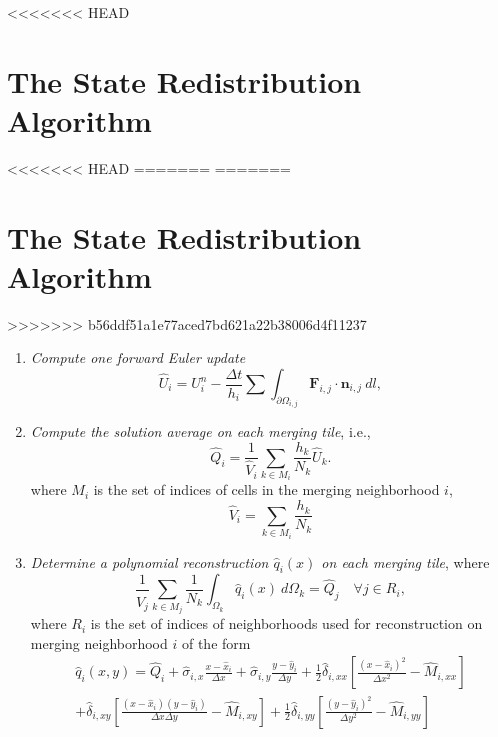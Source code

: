<<<<<<< HEAD
\section{The State Redistribution Algorithm}\label{srdAlg}
<<<<<<< HEAD
=======
=======
\section{The State Redistribution Algorithm}\label{sec:srdAlg}
>>>>>>> b56ddf51a1e77aced7bd621a22b38006d4f11237
\begin{enumerate}[label=Step \arabic*:]
    \item \textit{Compute one forward Euler update}
    \begin{equation} 
    \hat{U}_i = U^n_i - \frac{\Delta t}{h_i}\sum \int_{\partial \Omega_{i,j}} \mathbf{F}_{i,j} \cdot \mathbf{n}_{i,j}~dl,\label{eq:scheme}
    \end{equation}
	\item \textit{Compute the solution average on each merging tile}, i.e.,
	\begin{equation}\label{eq:q_avg1}
	    \hat Q_i =  \frac{1}{\hat V_i}\sum_{k \in M_i}\frac{h_k}{N_k} \hat U_k.
	\end{equation}
	where $M_i$ is the set of indices of cells in the merging neighborhood $i$, 
	\begin{equation}\label{eq:modV}
	\hat V_i = \sum_{k \in M_i}\frac{h_k}{N_k}
	\end{equation}
\item \textit{Determine a polynomial reconstruction $\hat q_i(x)$ on each merging tile}, where
\begin{equation}\label{eq:qi}
\frac{1}{\hat V_j}\sum_{k \in M_j}\frac{1}{N_k}\int_{\Omega_k} \hat q_i(x)~d\Omega_k = \hat Q_j \quad \forall j \in R_i,
\end{equation}
where $R_i$ is the set of indices of neighborhoods used for reconstruction on merging neighborhood $i$ of the form
\begin{equation}\label{eq:q}
\begin{aligned}
	    \hat q_i(x,y) = \hat Q_{i} + \hat \sigma_{i,x}\frac{x-\hat x_i}{\Delta x} +  \hat \sigma_{i,y}\frac{y-\hat y_i}{\Delta y} + \frac{1}{2}\hat \delta_{i, xx}\left[ \frac{(x - \hat x_i)^2 }{\Delta x^2} - \hat M_{i,xx}\right]\\
	    +\hat \delta_{i, xy}\left[ \frac{(x - \hat x_i) (y - \hat y_i) }{\Delta x \Delta y} - \hat M_{i,xy}\right] + \frac{1}{2}\hat \delta_{i, yy}\left[ \frac{(y - \hat y_i)^2 }{\Delta y^2} -  \hat M_{i,yy}\right]\\

\end{aligned}
\end{equation}
\end{enumerate}
